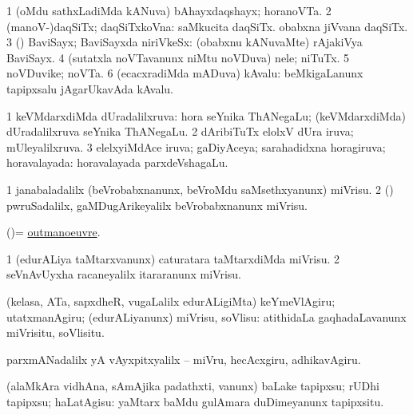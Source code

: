 \bentry
{}
\gl{\nA}
\bmng
\bnum
\num{1} (oMdu sathxLadiMda kANuva) bAhayxdaqshayx; horanoVTa. 
\num{2} (manoV-)daqSiTx; daqSiTxkoVna:  saMkucita daqSiTx.  obabxna jiVvana daqSiTx. 
\num{3} (\rUpa) BaviSayx; BaviSayxda niriVkeSx:  (obabxnu kANuvaMte) rAjakiVya BaviSayx. 
\num{4} (sutatxla noVTavanunx niMtu noVDuva) nele; niTuTx. 
\num{5} noVDuvike; noVTa. 
\num{6} (ecacxradiMda mADuva) kAvalu:  beMkigaLanunx tapipxsalu jAgarUkavAda kAvalu. 
\enum
\emng
\eentry

\bentry
{}
\gl{\gu}
\bmng
\bnum
\num{1} keVMdarxdiMda dUradalilxruva:  hora seYnika ThANegaLu; (keVMdarxdiMda) dUradalilxruva seYnika ThANegaLu. 
\num{2} dAribiTuTx elolxV dUra iruva; mUleyalilxruva. 
\num{3} elelxyiMdAce iruva; gaDiyAceya; sarahadidxna horagiruva; horavalayada:  horavalayada parxdeVshagaLu. 
\enum
\emng
\eentry

\bentry
{}
\gl{\sakirx}
\bmng
\bnum
\num{1} janabaladalilx (beVrobabxnanunx, beVroMdu saMsethxyanunx) miVrisu. 
\num{2} (\pArxparx) pwruSadalilx, gaMDugArikeyalilx beVrobabxnanunx miVrisu. 
\enum
\emng
\eentry

\bentry
{}
\gl{\sakirx}
\bmng
(\ame)= \hyperlink{outmanoeuvre}{outmanoeuvre}. 
\emng
\eentry

\bentry
{}
\gl{\sakirx}
\bmng
\bnum
\num{1} (edurALiya taMtarxvanunx) caturatara taMtarxdiMda miVrisu. 
\num{2} seVnAvUyxha racaneyalilx itararanunx miVrisu. 
\enum
\emng
\eentry

\bentry
{}
\gl{\sakirx}
\bmng
(kelasa, ATa, sapxdheR, \mo vugaLalilx edurALigiMta) keYmeVlAgiru; utatxmanAgiru; (edurALiyanunx) miVrisu, soVlisu:  atithidaLa gaqhadaLavanunx miVrisitu, soVlisitu. 
\emng
\eentry

\bentry
{}
\gl{\sakirx}
\bmng
parxmANadalilx yA vAyxpitxyalilx -- miVru, hecAcxgiru, adhikavAgiru. 
\emng
\eentry

\bentry
{}
\gl{\sakirx}
\bmng
(alaMkAra vidhAna, sAmAjika padathxti, \mo vanunx) baLake tapipxsu; rUDhi tapipxsu; haLatAgisu:  yaMtarx baMdu gulAmara duDimeyanunx tapipxsitu. 
\emng
\eentry

